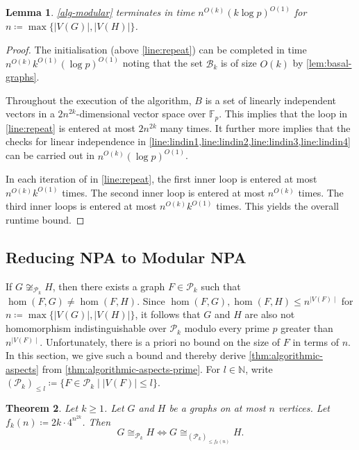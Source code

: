 \documentclass[a4paper,onecolumn,11pt,accepted=2026-01-06]{quantumarticle}
\theoremstyle{plain}
\newtheorem{thm}{Theorem}[section]
\newtheorem{lem}[thm]{Lemma}
\theoremstyle{remark}
\theoremstyle{definition}
\begin{document}
\begin{lem} \label{lem:runtime}
    \cref{alg-modular} terminates in time $n^{O(k)} (k \log p)^{O(1)}$ for $n \coloneqq \max \{\lvert V(G) \rvert , \lvert V(H) \rvert  \}$.
\end{lem}
\begin{proof}
	The initialisation (above \cref{line:repeat}) can be completed in time $n^{O(k)} k^{O(1)} (\log p)^{O(1)}$ noting that the set $\mathcal{B}_k$ is of size $O(k)$ by \cref{lem:basal-graphs}.
	
    Throughout the execution of the algorithm, $B$ is a set of linearly independent vectors in a $2n^{2k}$-dimensional vector space over $\mathbb{F}_p$.
    This implies that the loop in \cref{line:repeat} is entered at most $2n^{2k}$ many times.
    It further more implies that the checks for linear independence in \cref{line:lindin1,line:lindin2,line:lindin3,line:lindin4} can be carried out in $n^{O(k)} (\log p)^{O(1)}$.

	In each iteration of in \cref{line:repeat}, 
	the first inner loop is entered at most $n^{O(k)} k^{O(1)}$ times.
	The second inner loop is entered at most $n^{O(k)}$ times.
	The third inner loops is entered at most $n^{O(k)} k^{O(1)}$ times.
	This yields the overall runtime bound.
\end{proof}

\subsection{Reducing NPA to Modular NPA}

If $G \not\cong_{\mathcal{P}_k} H$, then there exists a graph $F \in \mathcal{P}_k$ such that $\hom(F, G) \neq \hom(F, H)$.
Since $\hom(F, G), \hom(F, H) \leq n^{\mid V(F)\mid }$ for $n \coloneqq \max\{\lvert V(G) \rvert , \lvert V(H) \rvert \}$, 
it follows that $G$ and $H$ are also not homomorphism indistinguishable over $\mathcal{P}_k$ modulo every prime $p$ greater than $n^{\mid V(F)\mid }$.
Unfortunately, there is a priori no bound on the size of $F$ in terms of $n$.
In this section, we give such a bound and thereby derive \cref{thm:algorithmic-aspects} from \cref{thm:algorithmic-aspects-prime}.
For $l \in \mathbb{N}$, 
write $(\mathcal{P}_k)_{\leq l} \coloneqq \{ F \in \mathcal{P}_k \mid \lvert V(F)\lvert  \leq l\}$.

\begin{thm} \label{thm:witness-function}
	Let $k \geq 1$.
	Let $G$ and $H$ be a graphs on at most $n$ vertices.
	Let $f_k(n) \coloneqq 2k \cdot 4^{n^{2k}}$.
	Then 
	\[
		G \cong_{\mathcal{P}_k} H \iff
		G \cong_{(\mathcal{P}_k)_{\leq f_k(n)}} H.
	\]
\end{thm}
\end{document}
